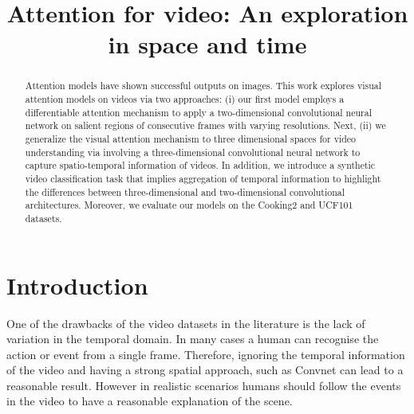\documentclass{article} %
\title{Attention for video: An exploration in space and time}
\begin{document}
\maketitle

\begin{abstract}
Attention models have shown successful outputs on images. This work explores visual attention models on videos via two approaches: (i) our first model employs a differentiable attention mechanism to apply a two-dimensional convolutional neural network on salient regions of consecutive frames with varying resolutions.
Next, (ii) we generalize the visual attention mechanism to three dimensional spaces for video understanding via involving a three-dimensional convolutional neural network to capture spatio-temporal information of videos.
In addition, we introduce a synthetic video classification task that implies aggregation of temporal information to highlight the differences between three-dimensional and two-dimensional convolutional architectures. Moreover, we evaluate our models on the Cooking2 and UCF101 datasets.
\end{abstract}

\section{Introduction}
One of the drawbacks of the video datasets in the literature is the lack of variation in the temporal domain. In many cases a human can recognise the action or event from a single frame. Therefore, ignoring the temporal information of the video and having a strong spatial approach, such as Convnet can lead to a reasonable result. However in realistic scenarios humans should follow the events in the video to have a reasonable explanation of the scene. 
\end{document}
